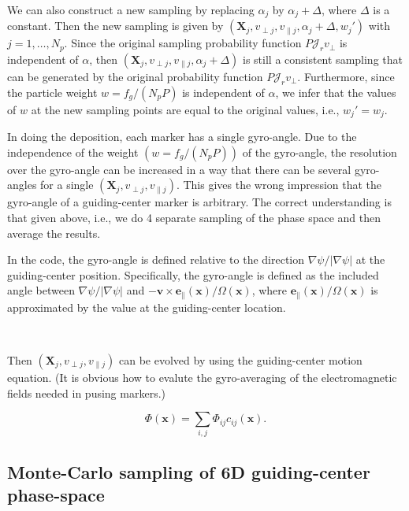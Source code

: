 \documentclass{article}
\begin{document}
We can also construct a new sampling by replacing $\alpha_j$ by $\alpha_j +
\Delta$, where $\Delta$ is a constant. Then the new sampling is given by
$(\mathbf{X}_j, v_{\perp j}, v_{\parallel j}, \alpha_j + \Delta, w_j')$ with
$j = 1, \ldots, N_p$. Since the original sampling probability function $P
\mathcal{J}_r v_{\perp}$ is independent of $\alpha$, then $(\mathbf{X}_j,
v_{\perp j}, v_{\parallel j}, \alpha_j + \Delta)$ is still a consistent
sampling that can be generated by the original probability function $P
\mathcal{J}_r v_{\perp}$. Furthermore, since the particle weight $w = f_g /
(N_p P)$ is independent of $\alpha$, we infer that the values of $w$ at the
new sampling points are equal to the original values, i.e., $w_j' = w_j$.

In doing the deposition, each marker has a single gyro-angle. Due to the
independence of the weight $(w = f_g / (N_p P))$ of the gyro-angle, the
resolution over the gyro-angle can be increased in a way that there can be
several gyro-angles for a single $(\mathbf{X}_j, v_{\perp j}, v_{\parallel
j})$. This gives the wrong impression that the gyro-angle of a guiding-center
marker is arbitrary. The correct understanding is that given above, i.e., we
do 4 separate sampling of the phase space and then average the results.

In the code, the gyro-angle is defined relative to the direction $\nabla \psi
/ | \nabla \psi |$ at the guiding-center position. Specifically, the
gyro-angle is defined as the included angle between $\nabla \psi / | \nabla
\psi |$ and $-\mathbf{v} \times \mathbf{e}_{\parallel} (\mathbf{x}) / \Omega
(\mathbf{x})$, where $\mathbf{e}_{\parallel} (\mathbf{x}) / \Omega
(\mathbf{x})$ is approximated by the value at the guiding-center location.

\

Then $(\mathbf{X}_j, v_{\perp j}, v_{\parallel j})$ can be evolved by using
the guiding-center motion equation. (It is obvious how to evalute the
gyro-averaging of the electromagnetic fields needed in pusing markers.)


\begin{equation}
  \Phi (\mathbf{x}) = \sum_{i, j} \Phi_{i j} c_{i j} (\mathbf{x}) .
\end{equation}
\subsection{Monte-Carlo sampling of 6D guiding-center phase-space
}\label{19-1-28-1}
\end{document}
